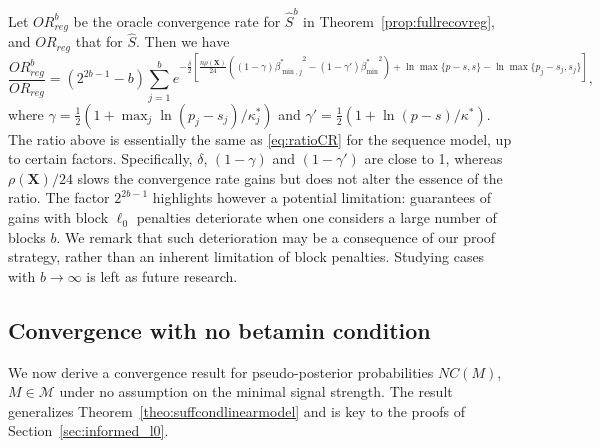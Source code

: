 \documentclass[bj,authoryear]{imsart}
\theoremstyle{plain}
\newcommand{\bs}{\boldsymbol}
\begin{document}
Let ${OR}^b_{reg}$ be the oracle convergence rate for $\hat{S}^{b}$ in Theorem~\ref{prop:fullrecovreg}, and ${OR}_{reg}$ that for $\hat{S}$. Then we have
\begin{equation*}
    \frac{{OR}^b_{reg}}{{OR}_{reg}}=(2^{2b-1}-b)\sum_{j=1}^be^{-\frac{\delta}{2}\left[\frac{ n\rho(\bs X)}{24}\left((1-\gamma){\beta^*_{\min,j}}^2-(1-\gamma'){\beta_{\min}^*}^2\right)+\ln \max\{p-s,s\}-\ln \max\{p_j-s_j,s_j\}\right]},
\end{equation*}
where $\gamma=\tfrac12(1+\max_j\ln(p_j-s_j)/\kappa_j^*)$ and $\gamma'=\tfrac12(1+\ln(p-s)/\kappa^*)$. The ratio above is essentially the same as \eqref{eq:ratioCR} for the sequence model, up to certain factors.  Specifically, $\delta$, $(1-\gamma)$ and $(1-\gamma')$ are close to 1, whereas $ \rho(\bs X)/24$ slows the convergence rate gains but does not alter the essence of the ratio. %
The factor $2^{2b-1}$ highlights however a potential limitation: guarantees of gains with block $\ell_0$ penalties deteriorate when one considers a large number of blocks $b$.
We remark that such deterioration may be a consequence of our proof strategy, rather than an inherent limitation of block penalties. Studying cases with %
$b \to \infty$ is left as future research.

\subsection{Convergence with no betamin condition}\label{ssec:nobetaminhyp}

We now derive a convergence result for pseudo-posterior probabilities $NC(M)$, $M\in\mathcal{M}$ under no assumption on the minimal signal strength. The result generalizes Theorem~\ref{theo:suffcondlinearmodel} and is key to the proofs of Section~\ref{sec:informed_l0}.
\end{document}
